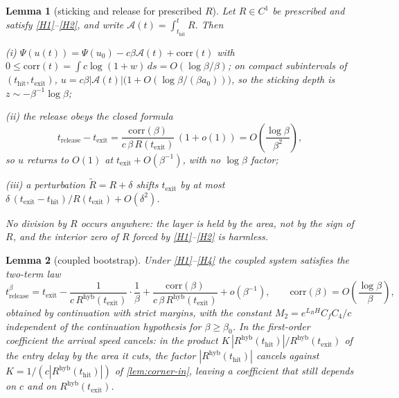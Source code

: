 \documentclass[11pt]{article}
\newtheorem{lemma}[lemma]{Lemma}
\theoremstyle{definition}
\theoremstyle{remark}
\newcommand{\thit}{t_{\mathrm{hit}}}
\newcommand{\texit}{t_{\mathrm{exit}}}
\newcommand{\trel}{t_{\mathrm{release}}}
\newcommand{\Ar}{\mathcal{A}}                      %
\newcommand{\hyb}{\mathrm{hyb}}
\begin{document}
\begin{lemma}[sticking and release for prescribed $R$]\label{lem:release}
Let $R\in C^1$ be prescribed and satisfy \eqref{H1}--\eqref{H2}, and write
$\Ar(t)=\int_{\thit}^{t}R$. Then

(i) $\Psi(u(t))=\Psi(u_0)-c\beta\Ar(t)+\mathrm{corr}(t)$ with
$0\le\mathrm{corr}(t)=\int c\log(1+w)\,ds=O(\log\beta/\beta)$; on compact
subintervals of $(\thit,\texit)$,
$u=c\beta|\Ar(t)|\bigl(1+O(\log\beta/(\beta a_0))\bigr)$, so the sticking depth is
$z\sim-\beta^{-1}\log\beta$;

(ii) the release obeys the closed formula
\begin{equation}\label{eq:release-prescribed}
\trel-\texit=\frac{\mathrm{corr}(\beta)}{c\,\beta\,R(\texit)}\,(1+o(1))
=O\!\left(\frac{\log\beta}{\beta^{2}}\right),
\end{equation}
so $u$ returns to $O(1)$ at $\texit+O(\beta^{-1})$, with no $\log\beta$ factor;

(iii) a perturbation $\tilde R=R+\delta$ shifts $\texit$ by at most
$\delta\,(\texit-\thit)/R(\texit)+O(\delta^{2})$.

No division by $R$ occurs anywhere: the layer is held by the area, not by the
sign of $R$, and the interior zero of $R$ forced by \eqref{H1}--\eqref{H2} is
harmless.
\end{lemma}

\begin{lemma}[coupled bootstrap]\label{lem:bootstrap}
Under \eqref{H1}--\eqref{H4} the coupled system satisfies the two-term law
\begin{equation}\label{eq:twoterm}
t^\beta_{\mathrm{release}}
=\texit-\frac{1}{c\,R^{\hyb}(\texit)}\cdot\frac{1}{\beta}
+\frac{\mathrm{corr}(\beta)}{c\,\beta\,R^{\hyb}(\texit)}+o(\beta^{-1}),
\qquad \mathrm{corr}(\beta)=O\!\left(\frac{\log\beta}{\beta}\right),
\end{equation}
obtained by continuation with strict margins, with the constant
$M_2=e^{L_BH}C_fC_4/c$ independent of the continuation hypothesis for
$\beta\ge\beta_0$. In the first-order coefficient the arrival speed cancels: in
the product $K\,|R^{\hyb}(\thit)|/R^{\hyb}(\texit)$ of the entry delay by the
area it cuts, the factor $|R^{\hyb}(\thit)|$ cancels against
$K=1/(c|R^{\hyb}(\thit)|)$ of \cref{lem:corner-in}, leaving a coefficient that
still depends on $c$ and on $R^{\hyb}(\texit)$.
\end{lemma}
\end{document}
